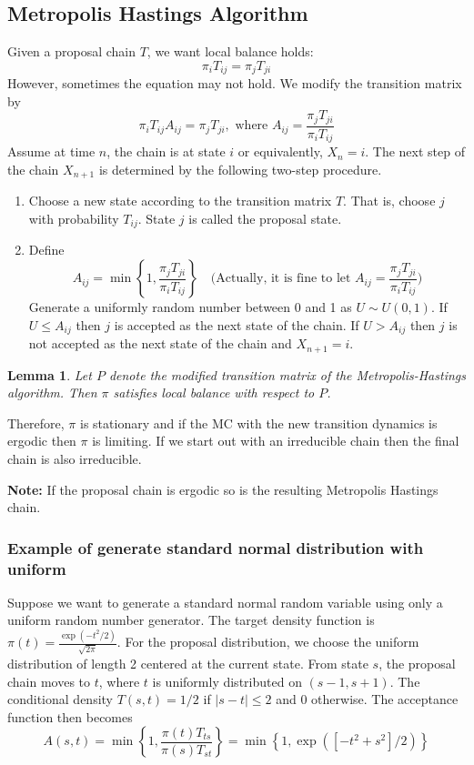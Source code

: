 \documentclass[11pt,a4paper]{article}
\newtheorem{lemma}{Lemma}
\begin{document}
\subsection{Metropolis Hastings Algorithm}
Given a proposal chain $T$, we want local balance holds: $$\pi_i T_{ij}=\pi_j T_{ji}$$
However, sometimes the equation may not hold. We modify the transition matrix by $$\pi_i T_{ij}A_{ij}=\pi_j T_{ji},\text{ where }A_{ij}=\frac{\pi_j T_{j i}}{\pi_i T_{i j}}$$
Assume at time $n$, the chain is at state $i$ or equivalently, $X_n=i$. The next step of the chain $X_{n+1}$ is determined by the following two-step procedure.
\begin{enumerate}
    \item Choose a new state according to the transition matrix $T$. That is, choose $j$ with probability $T_{i j}$. State $j$ is called the proposal state.
    \item Define
    $$
    A_{i j}=\min \left\{1, \frac{\pi_j T_{j i}}{\pi_i T_{i j}}\right\}\quad \text{(Actually, it is fine to let $A_{ij}=\frac{\pi_j T_{j i}}{\pi_i T_{i j}}$)}
    $$
    Generate a uniformly random number between 0 and 1 as $U \sim U(0,1)$. If $U \leq A_{i j}$ then $j$ is accepted as the next state of the chain. If $U>A_{i j}$ then $j$ is not accepted as the next state of the chain and $X_{n+1}=i$.
\end{enumerate}
\begin{lemma}
    Let $P$ denote the modified transition matrix of the Metropolis-Hastings algorithm. Then $\pi$ satisfies local balance with respect to $P$.
\end{lemma}

Therefore, $\pi$ is stationary and if the MC with the new transition dynamics is ergodic then $\pi$ is limiting. If we start out with an irreducible chain then the final chain is also irreducible.

\textbf{Note:} If the proposal chain is ergodic so is the resulting Metropolis Hastings chain.


\subsubsection{Example of generate standard normal distribution with uniform}
Suppose we want to generate a standard normal random variable using only a uniform random number generator. The target density function is $\pi(t)=\frac{\exp \left(-t^2 / 2\right)}{\sqrt{2 \pi}}$. For the proposal distribution, we choose the uniform distribution of length 2 centered at the current state. From state $s$, the proposal chain moves to $t$, where $t$ is uniformly distributed on $(s-1, s+1)$. The conditional density $T(s, t)=1 / 2$ if $|s-t| \leq 2$ and 0 otherwise. The acceptance function then becomes
$$
A(s, t)=\min \left\{1, \frac{\pi(t) T_{t s}}{\pi(s) T_{s t}}\right\}=\min \left\{1, \exp \left(\left[-t^2+s^2\right] / 2\right)\right\}
$$
\end{document}
